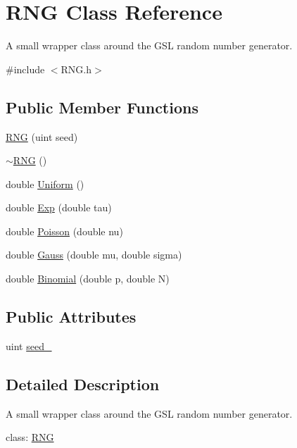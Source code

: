 \hypertarget{classRNG}{\section{R\-N\-G Class Reference}
\label{classRNG}
}


A small wrapper class around the G\-S\-L random number generator.  




{\ttfamily \#include $<$R\-N\-G.\-h$>$}

\subsection*{Public Member Functions}
\begin{DoxyCompactItemize}
\item 
\hyperlink{classRNG_add68b5f4738198b83f1021a1817fd821}{R\-N\-G} (uint seed)
\item 
\hyperlink{classRNG_abe0c541fcfa0b12ef7446eccb166d510}{$\sim$\-R\-N\-G} ()
\item 
double \hyperlink{classRNG_a6f369de914cf763da0a0bc8c17affb12}{Uniform} ()
\item 
double \hyperlink{classRNG_aa8a14d0a3367ada957ab898ff6974957}{Exp} (double tau)
\item 
double \hyperlink{classRNG_a959d86ea22fc5bb2f5ff6ded9881137a}{Poisson} (double nu)
\item 
double \hyperlink{classRNG_afe51d6c541a71af3a80c2ecf86d81523}{Gauss} (double mu, double sigma)
\item 
double \hyperlink{classRNG_a37fc5d27bda97b756e92565183f48d66}{Binomial} (double p, double N)
\end{DoxyCompactItemize}
\subsection*{Public Attributes}
\begin{DoxyCompactItemize}
\item 
uint \hyperlink{classRNG_a6b240cba939fb5463c7497153a852320}{seed\-\_\-}
\end{DoxyCompactItemize}


\subsection{Detailed Description}
A small wrapper class around the G\-S\-L random number generator. 

class\-: \hyperlink{classRNG}{R\-N\-G} 

